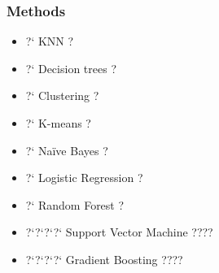 \documentclass{beamer}
\begin{document}
\begin{frame}
    \frametitle{Methods}

    \begin{itemize}
        \item ?` KNN  ?
        \item ?` Decision trees  ?
        \item ?` Clustering  ?
        \item ?` K-means  ?
        \item ?` Naïve Bayes  ?
        \item ?` Logistic Regression  ?
        \item ?` Random Forest  ?
        \item ?`?`?`?` Support Vector Machine  ????
        \item ?`?`?`?` Gradient Boosting  ???? 

    \end{itemize}

\end{frame}
\end{document}
